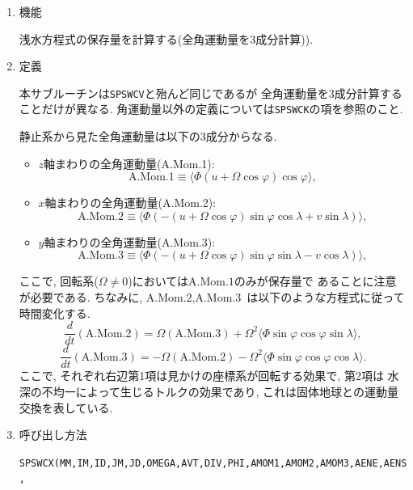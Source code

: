 \documentclass[a4j,fleqn]{jarticle}
\begin{document}
\begin{enumerate}

\item 機能

浅水方程式の保存量を計算する(全角運動量を3成分計算)).

\item 定義

本サブルーチンは{\tt SPSWCV}と殆んど同じであるが
全角運動量を3成分計算することだけが異なる.
角運動量以外の定義については{\tt SPSWCK}の項を参照のこと.

静止系から見た全角運動量は以下の3成分からなる.
\begin{itemize}
\item $z$軸まわりの全角運動量(A.Mom.1):
\begin{equation}
\mbox{A.Mom.1}\equiv\langle\Phi(u+\Omega\cos\varphi)\cos\varphi\rangle,
\end{equation}
\item $x$軸まわりの全角運動量(A.Mom.2):
\begin{equation}
\mbox{A.Mom.2}\equiv\langle\Phi(-(u+\Omega\cos\varphi)\sin\varphi\cos\lambda
+v\sin\lambda)\rangle,
\end{equation}
\item $y$軸まわりの全角運動量(A.Mom.3):
\begin{equation}
\mbox{A.Mom.3}\equiv\langle\Phi(-(u+\Omega\cos\varphi)\sin\varphi\sin\lambda
-v\cos\lambda)\rangle,
\end{equation}
\end{itemize}
ここで, 回転系($\Omega\neq 0$)においては$\mbox{A.Mom.1}$のみが保存量で
あることに注意が必要である. ちなみに, $\mbox{A.Mom.2},\mbox{A.Mom.3}$
は以下のような方程式に従って時間変化する.
\begin{equation}
\frac{d}{dt}(\mbox{A.Mom.2})
=\Omega (\mbox{A.Mom.3})
+\Omega^2\langle\Phi\sin\varphi\cos\varphi\sin\lambda\rangle,
\end{equation}
\begin{equation}
\frac{d}{dt}(\mbox{A.Mom.3})
=-\Omega(\mbox{A.Mom.2})
-\Omega^2\langle\Phi\sin\varphi\cos\varphi\cos\lambda\rangle.
\end{equation}
ここで, それぞれ右辺第1項は見かけの座標系が回転する効果で, 第2項は
水深の不均一によって生じるトルクの効果であり, これは固体地球との運動量
交換を表している.

\item 呼び出し方法 

{\tt SPSWCX(MM,IM,ID,JM,JD,OMEGA,AVT,DIV,PHI,AMOM1,AMOM2,AMOM3,AENE,AENS,}\\
\hspace*{10em}{\tt RN,IT,T,Y,IP,P,R,IA,A,Q,WS,WW)}
  

\end{enumerate}
\end{document}
